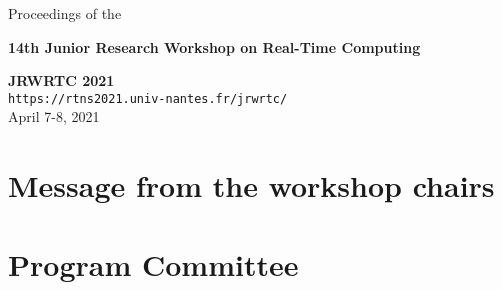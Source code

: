 \documentclass[12pt]{article}
\begin{document}


\begin{center}
	\thispagestyle{empty}
	\LARGE{Proceedings of the}\\[-0.9ex]
	\vspace{0.1cm}
	\begin{center}

		\vspace{0.1cm}
		\textbf{\LARGE{14th Junior Research Workshop on Real-Time Computing}}
		\bigskip\par

		\textbf{\LARGE{JRWRTC 2021}}\\
		\vspace{0.3cm}
		\large{\texttt{https://rtns2021.univ-nantes.fr/jrwrtc/}}\\[-0.5ex]
		\vspace{0.3cm}
		\large{April 7-8, 2021}\\[-1ex]
		\vspace{0.6cm}
	\end{center}
	\medskip
\end{center}



\newpage

\section*{Message from the workshop chairs}



\newpage

\section*{Program Committee}


	
\newpage

\newcommand{\addsection}[3]{\addtocontents{toc}{\protect\contentsline{section}{\protect\numberline{#1}#2}{#3}}}
\newcommand{\addsubsection}[3]{\addtocontents{toc}{\protect\contentsline{subsection}{\protect\numberline{#1}#2}{#3}}}
\end{document}
